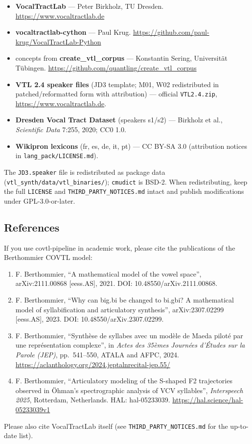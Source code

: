 \documentclass[11pt,a4paper]{article}
\begin{document}
\begin{itemize}[leftmargin=1.5em]
\sloppy
\item \textbf{VocalTractLab} --- Peter Birkholz, TU Dresden.
      \url{https://www.vocaltractlab.de}
\item \textbf{vocaltractlab-cython} --- Paul Krug.
      \url{https://github.com/paul-krug/VocalTractLab-Python}
\item concepts from \textbf{create\_vtl\_corpus} --- Konstantin Sering,
      Universität Tübingen.
      \url{https://github.com/quantling/create_vtl_corpus}
\item \textbf{VTL 2.4 speaker files} (JD3 template; M01, W02
      redistributed in patched/reformatted form with attribution) ---
      official \texttt{VTL2.4.zip}, \url{https://www.vocaltractlab.de}.
\item \textbf{Dresden Vocal Tract Dataset} (speakers s1/s2) ---
      Birkholz et al., \emph{Scientific Data} 7:255, 2020; CC0 1.0.
\item \textbf{Wikipron lexicons} (fr, es, de, it, pt) --- CC BY-SA 3.0
      (attribution notices in \texttt{lang\_pack/LICENSE.md}).
\end{itemize}

The \texttt{JD3.speaker} file is redistributed as package data
(\texttt{vtl\_synth/data/vtl\_binaries/}); \texttt{cmudict} is BSD-2.
When redistributing, keep the full \texttt{LICENSE} and
\texttt{THIRD\_PARTY\_NOTICES.md} intact and publish modifications under
GPL-3.0-or-later.

\subsection*{References}

If you use covtl-pipeline in academic work, please cite the publications
of the Berthommier COVTL model:

\begin{enumerate}[leftmargin=1.8em,itemsep=3pt]
\sloppy
\item F. Berthommier, ``A mathematical model of the vowel space'',
      arXiv:2111.00868 [eess.AS], 2021.
      DOI: 10.48550/arXiv.2111.00868.
\item F. Berthommier, ``Why can big.bi be changed to bi.gbi? A
      mathematical model of syllabification and articulatory synthesis'',
      arXiv:2307.02299 [eess.AS], 2023.
      DOI: 10.48550/arXiv.2307.02299.
\item F. Berthommier, ``Synthèse de syllabes avec un modèle de Maeda
      piloté par une représentation complexe'', in \emph{Actes des
      35èmes Journées d'Études sur la Parole (JEP)}, pp.~541--550,
      ATALA and AFPC, 2024.
      \url{https://aclanthology.org/2024.jeptalnrecital-jep.55/}
\item F. Berthommier, ``Articulatory modeling of the S-shaped F2
      trajectories observed in Öhman's spectrographic analysis of VCV
      syllables'', \emph{Interspeech 2025}, Rotterdam, Netherlands.
      HAL: hal-05233039. \url{https://hal.science/hal-05233039v1}
\end{enumerate}

Please also cite VocalTractLab itself (see
\texttt{THIRD\_PARTY\_NOTICES.md} for the up-to-date list).
\end{document}
